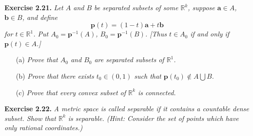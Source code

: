 \documentclass{article}
\begin{document}
\textbf{Exercise 2.21.}
\emph{Let $A$ and $B$ be separated subsets of some $\mathbb{R}^k$,
suppose $\mathbf{a} \in A$, $\mathbf{b} \in B$, and define
$$\mathbf{p}(t) = (1-t)\mathbf{a} + t\mathbf{b}$$
for $t \in \mathbb{R}^1$.
Put $A_0 = \mathbf{p}^{-1}(A)$,
$B_0 = \mathbf{p}^{-1}(B)$.
[Thus $t \in A_0$ if and only if $\mathbf{p}(t) \in A$.]}
\begin{enumerate}
\item[(a)]
\emph{Prove that $A_0$ and $B_0$ are separated subsets of $\mathbb{R}^1$.}
\item[(b)]
\emph{Prove that there exists $t_0 \in (0,1)$ such that
$\mathbf{p}(t_0) \notin A \bigcup B$.}
\item[(c)]
\emph{Prove that every convex subset of $\mathbb{R}^k$ is connected.} \\
\end{enumerate}





\textbf{Exercise 2.22.}
\emph{A metric space is called separable if it contains a countable dense subset.
Show that $\mathbb{R}^k$ is separable.
(Hint: Consider the set of points which have only rational coordinates.)} \\
\end{document}
